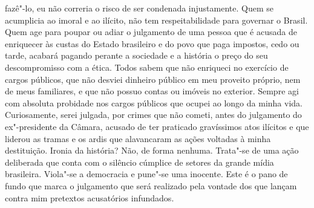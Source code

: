 fazê"-lo, eu não correria o risco de ser condenada injustamente. Quem se
acumplicia ao imoral e ao ilícito, não tem respeitabilidade para
governar o Brasil. Quem age para poupar ou adiar o julgamento de uma
pessoa que é acusada de enriquecer às custas do Estado brasileiro e do
povo que paga impostos, cedo ou tarde, acabará pagando perante a
sociedade e a história o preço do seu descompromisso com a ética. Todos
sabem que não enriqueci no exercício de cargos públicos, que não desviei
dinheiro público em meu proveito próprio, nem de meus familiares, e que
não possuo contas ou imóveis no exterior. Sempre agi com absoluta
probidade nos cargos públicos que ocupei ao longo da minha vida.
Curiosamente, serei julgada, por crimes que não cometi, antes do
julgamento do ex"-presidente da Câmara, acusado de ter praticado
gravíssimos atos ilícitos e que liderou as tramas e os ardis que
alavancaram as ações voltadas à minha destituição. Ironia da história?
Não, de forma nenhuma. Trata"-se de uma ação deliberada que conta com o
silêncio cúmplice de setores da grande mídia brasileira. Viola"-se a
democracia e pune"-se uma inocente. Este é o pano de fundo que marca o
julgamento que será realizado pela vontade dos que lançam contra mim
pretextos acusatórios infundados.

